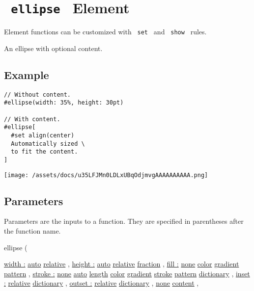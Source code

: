 \section{\texorpdfstring{\texttt{\ ellipse\ } {{ Element
}}}{ ellipse   Element }}\label{summary}

\label{element-tooltip}
Element functions can be customized with \texttt{\ set\ } and
\texttt{\ show\ } rules.

An ellipse with optional content.

\subsection{Example}\label{example}

\begin{verbatim}
// Without content.
#ellipse(width: 35%, height: 30pt)

// With content.
#ellipse[
  #set align(center)
  Automatically sized \
  to fit the content.
]
\end{verbatim}

\texttt{[image: /assets/docs/u35LFJMn0LDLxUBqOdjmvgAAAAAAAAAA.png]}

\subsection{\texorpdfstring{{ Parameters
}}{ Parameters }}\label{parameters}

\label{parameters-tooltip}
Parameters are the inputs to a function. They are specified in
parentheses after the function name.

{ ellipse } (

{ \hyperref[parameters-width]{width :}
\href{/docs/reference/foundations/auto/}{auto}
\href{/docs/reference/layout/relative/}{relative} , } {
\hyperref[parameters-height]{height :}
\href{/docs/reference/foundations/auto/}{auto}
\href{/docs/reference/layout/relative/}{relative}
\href{/docs/reference/layout/fraction/}{fraction} , } {
\hyperref[parameters-fill]{fill :}
\href{/docs/reference/foundations/none/}{none}
\href{/docs/reference/visualize/color/}{color}
\href{/docs/reference/visualize/gradient/}{gradient}
\href{/docs/reference/visualize/pattern/}{pattern} , } {
\hyperref[parameters-stroke]{stroke :}
\href{/docs/reference/foundations/none/}{none}
\href{/docs/reference/foundations/auto/}{auto}
\href{/docs/reference/layout/length/}{length}
\href{/docs/reference/visualize/color/}{color}
\href{/docs/reference/visualize/gradient/}{gradient}
\href{/docs/reference/visualize/stroke/}{stroke}
\href{/docs/reference/visualize/pattern/}{pattern}
\href{/docs/reference/foundations/dictionary/}{dictionary} , } {
\hyperref[parameters-inset]{inset :}
\href{/docs/reference/layout/relative/}{relative}
\href{/docs/reference/foundations/dictionary/}{dictionary} , } {
\hyperref[parameters-outset]{outset :}
\href{/docs/reference/layout/relative/}{relative}
\href{/docs/reference/foundations/dictionary/}{dictionary} , } {
\hyperref[parameters-body]{}
\href{/docs/reference/foundations/none/}{none}
\href{/docs/reference/foundations/content/}{content} , }

